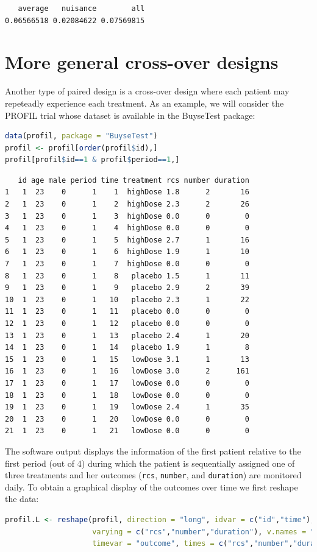 \documentclass[12pt]{article}
\begin{document}
\label{}
\begin{verbatim}
   average   nuisance        all 
0.06566518 0.02084622 0.07569815
\end{verbatim}


\clearpage
\section{More general cross-over designs}
\label{sec:org3c84a54}
Another type of paired design is a cross-over design where each
patient may repeteadly experience each treatment. As an example, we
will consider the PROFIL trial whose dataset is available in the
BuyseTest package:
\begin{lstlisting}[language=r,numbers=none]
data(profil, package = "BuyseTest")
profil <- profil[order(profil$id),]
profil[profil$id==1 & profil$period==1,]
\end{lstlisting}

\label{}
\begin{verbatim}
   id age male period time treatment rcs number duration
1   1  23    0      1    1  highDose 1.8      2       16
2   1  23    0      1    2  highDose 2.3      2       26
3   1  23    0      1    3  highDose 0.0      0        0
4   1  23    0      1    4  highDose 0.0      0        0
5   1  23    0      1    5  highDose 2.7      1       16
6   1  23    0      1    6  highDose 1.9      1       10
7   1  23    0      1    7  highDose 0.0      0        0
8   1  23    0      1    8   placebo 1.5      1       11
9   1  23    0      1    9   placebo 2.9      2       39
10  1  23    0      1   10   placebo 2.3      1       22
11  1  23    0      1   11   placebo 0.0      0        0
12  1  23    0      1   12   placebo 0.0      0        0
13  1  23    0      1   13   placebo 2.4      1       20
14  1  23    0      1   14   placebo 1.9      1        8
15  1  23    0      1   15   lowDose 3.1      1       13
16  1  23    0      1   16   lowDose 3.0      2      161
17  1  23    0      1   17   lowDose 0.0      0        0
18  1  23    0      1   18   lowDose 0.0      0        0
19  1  23    0      1   19   lowDose 2.4      1       35
20  1  23    0      1   20   lowDose 0.0      0        0
21  1  23    0      1   21   lowDose 0.0      0        0
\end{verbatim}

The software output displays the information of the first patient
relative to the first period (out of 4) during which the patient is
sequentially assigned one of three treatments and her outcomes (\texttt{rcs},
\texttt{number}, and \texttt{duration}) are monitored daily. To obtain a graphical
display of the outcomes over time we first reshape the data:
\begin{lstlisting}[language=r,numbers=none]
profil.L <- reshape(profil, direction = "long", idvar = c("id","time"),
                    varying = c("rcs","number","duration"), v.names = "value",
                    timevar = "outcome", times = c("rcs","number","duration"))
\end{lstlisting}
\end{document}
